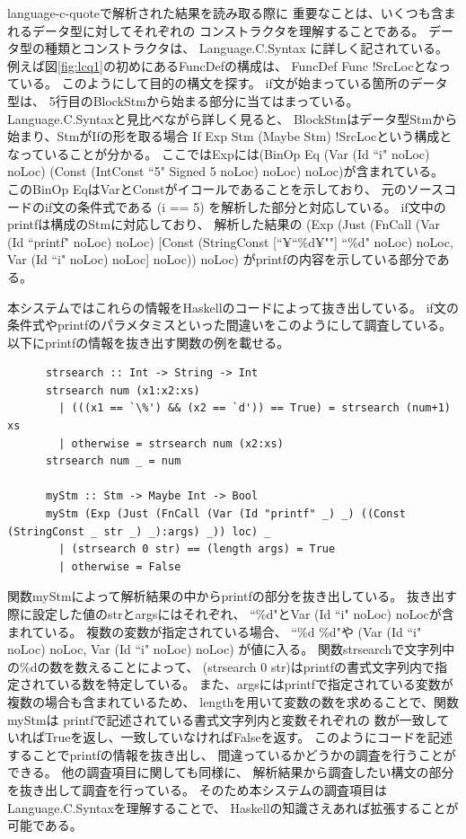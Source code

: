 \documentclass{csspaper}
\begin{document}
      language-c-quoteで解析された結果を読み取る際に
      重要なことは、いくつも含まれるデータ型に対してそれぞれの
      コンストラクタを理解することである。
      データ型の種類とコンストラクタは、      
      Language.C.Syntax \cite{12}に詳しく記されている。
      例えば図\ref{fig:lcq1}の初めにあるFuncDefの構成は、
      FuncDef Func !SrcLocとなっている。
      このようにして目的の構文を探す。
      if文が始まっている箇所のデータ型は、
      5行目のBlockStmから始まる部分に当てはまっている。
      Language.C.Syntaxと見比べながら詳しく見ると、
      BlockStmはデータ型Stmから始まり、StmがIfの形を取る場合
      If Exp Stm (Maybe Stm) !SrcLocという構成となっていることが分かる。
      ここではExpには(BinOp Eq (Var (Id ``i" noLoc) noLoc) 
      (Const (IntConst ``5" Signed 5 noLoc) noLoc) noLoc)が含まれている。
      このBinOp EqはVarとConstがイコールであることを示しており、
      元のソースコードのif文の条件式である (i == 5) を解析した部分と対応している。
      if文中のprintfは構成のStmに対応しており、
      解析した結果の (Exp (Just (FnCall (Var (Id ``printf" noLoc) noLoc) 
      [Const (StringConst [``¥``\%d¥""] ``\%d" noLoc) noLoc, Var (Id ``i" noLoc) noLoc] noLoc)) noLoc)
      がprintfの内容を示している部分である。

      本システムではこれらの情報をHaskellのコードによって抜き出している。
      if文の条件式やprintfのパラメタミスといった間違いをこのようにして調査している。
      以下にprintfの情報を抜き出す関数の例を載せる。

      \begin{lstlisting}
      strsearch :: Int -> String -> Int
      strsearch num (x1:x2:xs)
        | (((x1 == `\%') && (x2 == `d')) == True) = strsearch (num+1) xs
        | otherwise = strsearch num (x2:xs)
      strsearch num _ = num
      
      myStm :: Stm -> Maybe Int -> Bool
      myStm (Exp (Just (FnCall (Var (Id "printf" _) _) ((Const (StringConst _ str _) _):args) _)) loc) _
        | (strsearch 0 str) == (length args) = True
        | otherwise = False
      \end{lstlisting}

      関数myStmによって解析結果の中からprintfの部分を抜き出している。
      抜き出す際に設定した値のstrとargsにはそれぞれ、
      ``\%d"とVar (Id ``i" noLoc) noLocが含まれている。
      複数の変数が指定されている場合、
      ``\%d \%d"や (Var (Id ``i" noLoc) noLoc, Var (Id ``i" noLoc) noLoc) が値に入る。
      関数strsearchで文字列中の\%dの数を数えることによって、
      (strsearch 0 str)はprintfの書式文字列内で指定されている数を特定している。
      また、argsにはprintfで指定されている変数が複数の場合も含まれているため、
      lengthを用いて変数の数を求めることで、関数myStmは
      printfで記述されている書式文字列内と変数それぞれの
      数が一致していればTrueを返し、一致していなければFalseを返す。
      このようにコードを記述することでprintfの情報を抜き出し、
      間違っているかどうかの調査を行うことができる。
      他の調査項目に関しても同様に、
      解析結果から調査したい構文の部分を抜き出して調査を行っている。
      そのため本システムの調査項目はLanguage.C.Syntaxを理解することで、
      Haskellの知識さえあれば拡張することが可能である。
\end{document}
